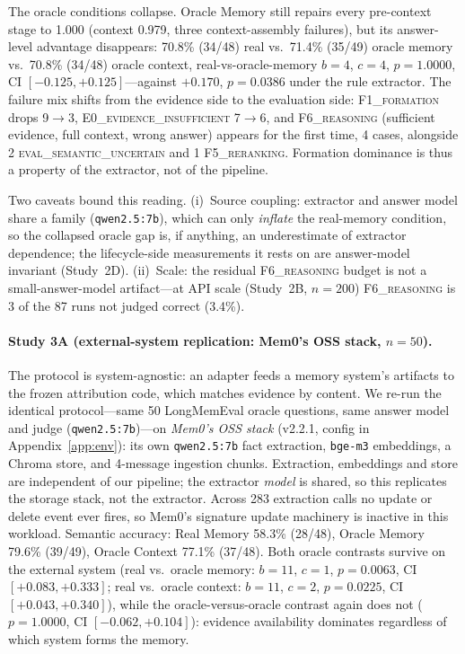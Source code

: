 \documentclass[11pt]{article}
\newcommand{\fone}{F1\textsc{\_formation}}
\newcommand{\ffive}{F5\textsc{\_reranking}}
\newcommand{\fsix}{F6\textsc{\_reasoning}}
\newcommand{\ezero}{E0\textsc{\_evidence\_insufficient}}
\newcommand{\evaluncertain}{\textsc{eval\_semantic\_uncertain}}
\begin{document}
The oracle conditions collapse. Oracle Memory still repairs
every pre-context stage to 1.000 (context 0.979, three context-assembly
failures), but its answer-level advantage disappears: 70.8\% (34/48)
real vs.\ 71.4\% (35/49) oracle memory vs.\ 70.8\% (34/48) oracle
context, real-vs-oracle-memory $b{=}4$, $c{=}4$, $p{=}1.0000$, CI
$[-0.125, +0.125]$---against $+0.170$, $p{=}0.0386$ under the rule
extractor. The failure mix shifts from the evidence side to the
evaluation side: \fone{} drops 9$\to$3, \ezero{} 7$\to$6, and \fsix{}
(sufficient evidence, full context, wrong answer) appears for the first
time, 4 cases, alongside 2 \evaluncertain{} and 1 \ffive{}. Formation
dominance is thus a property of the extractor, not of the pipeline.

Two caveats bound this reading. (i)~Source coupling: extractor and answer
model share a family (\texttt{qwen2.5:7b}), which can only \emph{inflate}
the real-memory condition, so the collapsed oracle gap is, if anything,
an underestimate of extractor dependence; the lifecycle-side measurements
it rests on are answer-model invariant (Study~2D). (ii)~Scale: the
residual \fsix{} budget is not a small-answer-model artifact---at API
scale (Study~2B, $n{=}200$) \fsix{} is 3 of the 87 runs not judged
correct (3.4\%).

\paragraph{Study 3A (external-system replication: Mem0's OSS stack, $n{=}50$).}
The protocol is system-agnostic: an adapter feeds a memory system's
artifacts to the frozen attribution code, which matches evidence by
content. We re-run the identical protocol---same 50 LongMemEval oracle
questions, same answer model and judge (\texttt{qwen2.5:7b})---on
\emph{Mem0's OSS stack} \cite{mem0} (v2.2.1, config in
Appendix~\ref{app:env}): its own \texttt{qwen2.5:7b} fact extraction,
\texttt{bge-m3} embeddings, a Chroma store, and 4-message ingestion
chunks. Extraction, embeddings and store are independent of our
pipeline; the extractor \emph{model} is shared, so this replicates the
storage stack, not the extractor. Across 283 extraction calls no update
or delete event ever fires, so Mem0's signature update machinery is
inactive in this workload. Semantic accuracy: Real Memory 58.3\%
(28/48), Oracle Memory 79.6\% (39/49), Oracle Context 77.1\% (37/48).
Both oracle contrasts survive on the external system (real vs.\ oracle
memory: $b{=}11$, $c{=}1$, $p{=}0.0063$, CI $[+0.083, +0.333]$; real
vs.\ oracle context: $b{=}11$, $c{=}2$, $p{=}0.0225$, CI $[+0.043,
+0.340]$), while the oracle-versus-oracle contrast again does not
($p{=}1.0000$, CI $[-0.062, +0.104]$): evidence availability dominates
regardless of which system forms the memory.
\end{document}
